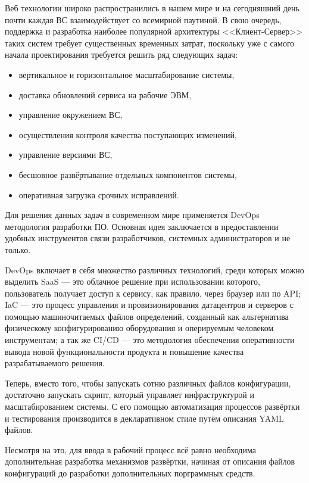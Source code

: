 \Introduction

Веб технологии широко распространились в нашем мире и на сегодняшний день почти каждая ВС взаимодействует со всемирной паутиной.
В свою очередь, поддержка и разработка наиболее популярной архитектуры <<Клиент-Сервер>> таких систем требует существенных временных затрат, поскольку уже с самого начала проектирования требуется решить ряд следующих задач:

\begin{itemize}
    \item вертикальное и горизонтальное масштабирование системы,
    \item доставка обновлений сервиса на рабочие ЭВМ,
    \item управление окружением ВС,
    \item осуществления контроля качества поступающих изменений,
    \item управление версиями ВС,
    \item бесшовное развёртывание отдельных компонентов системы,
    \item оперативная загрузка срочных исправлений.
\end{itemize}

Для решения данных задач в современном мире применяется DevOps методология разработки ПО.
Основная идея заключается в предоставлении удобных инструментов связи разработчиков, системных администраторов и не только.

DevOps включает в себя множество различных технологий, среди которых можно выделить
SaaS --- это облачное решение при использовании
которого, пользователь получает доступ к сервису, как правило, через браузер или по API;
IaC --- это процесс управления и провизионирования датацентров и серверов с помощью машиночитаемых файлов определений,
созданный как альтернатива физическому конфигурированию оборудования и оперируемым человеком инструментам;
а так же CI/CD --- это методология обеспечения оперативности вывода новой функциональности продукта и повышение качества разрабатываемого решения.

Теперь, вместо того, чтобы запускать сотню различных файлов конфигурации,
достаточно запускать скрипт, который управляет инфраструктурой и масштабированием системы.
С его помощью автоматизация процессов развёртки и тестирования производится в декларативном стиле путём описания YAML файлов.

Несмотря на это, для ввода в рабочий процесс всё равно необходима дополнительная разработка механизмов развёртки,
начиная от описания файлов конфигураций до разработки дополнительных порграммных средств.

